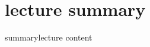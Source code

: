     \section[summary]{lecture summary}
        \begin{frame}{summary}{lecture content}
        \end{frame}


